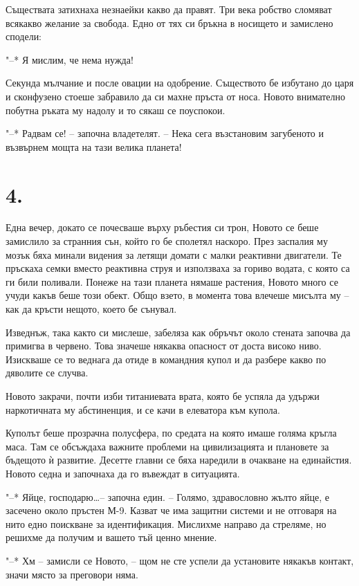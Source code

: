 \documentclass[ebook,openany,12pt]{memoir}
\begin{document}
Съществата затихнаха незнаейки какво да правят. Три века робство сломяват всякакво желание за свобода. Едно от тях си бръкна в носището и замислено сподели:

"--* Я мислим, че нема нужда!

Секунда мълчание и после овации на одобрение. Съществото бе избутано до царя и сконфузено стоеше забравило да си махне пръста от носа. Новото внимателно побутна ръката му надолу и то сякаш се поуспокои.

"--* Радвам се! – започна владетелят. – Нека сега възстановим загубеното и възвърнем мощта на тази велика планета!

\section*{4.}

Една вечер, докато се почесваше върху ръбестия си трон, Новото се беше замислило за странния сън, който го бе сполетял наскоро. През заспалия му мозък бяха минали видения за летящи домати с малки реактивни двигатели. Те пръскаха семки вместо реактивна струя и използваха за гориво водата, с която са ги били поливали. Понеже на тази планета нямаше растения, Новото много се учуди какъв беше този обект. Общо взето, в момента това влечеше мисълта му – как да кръсти нещото, което бе сънувал.

Изведнъж, така както си мислеше, забеляза как обръчът около стената започва да примигва в червено. Това значеше някаква опасност от доста високо ниво. Изискваше се то веднага да отиде в командния купол и да разбере какво по дяволите се случва.

Новото закрачи, почти изби титаниевата врата, която бе успяла да удържи наркотичната му абстиненция, и се качи в елеватора към купола.

Куполът беше прозрачна полусфера, по средата на която имаше голяма кръгла маса. Там се обсъждаха важните проблеми на цивилизацията и плановете за бъдещото ѝ развитие. Десетте главни се бяха наредили в очакване на единайстия. Новото седна и започнаха да го въвеждат в ситуацията.

"--* Яйце, господарю\ldots -- започна един. – Голямо, здр\-авословно жълто яйце, е засечено около пръстен М-9. Казват че има защитни системи и не отговаря на нито едно поискване за идентификация. Мислихме направо да стреляме, но решихме да получим и вашето тъй ценно мнение.

"--* Хм -- замисли се Новото, – щом не сте успели да установите някакъв контакт, значи място за преговори няма.
\end{document}
